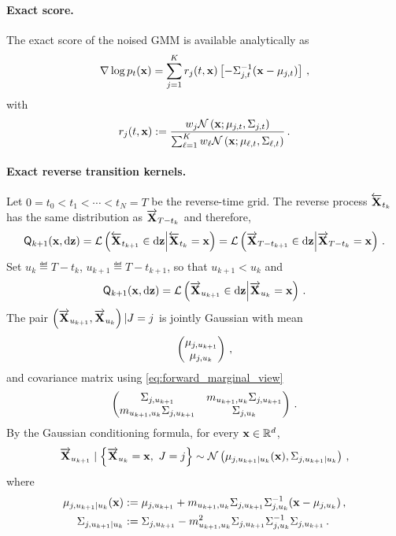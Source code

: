 \documentclass[11pt]{article}
\theoremstyle{plain}
\theoremstyle{definition}
\theoremstyle{remark}
\begin{document}
\paragraph{Exact score.} The exact score of the noised GMM is available analytically as
\begin{equation*} %
\nabla \log p_t(\x) = \sum_{j=1}^{K} r_j(t,\x) \left[ -\Sigma_{j,t}^{-1}(\x-\mu_{j,t}) \right] \eqsp,
\end{equation*}
with
\begin{equation*} %
r_j(t,\x) \eqdef \frac{ w_j\gaussiand{\mu_{j,t}}{\Sigma_{j,t}}[\x] }{ \sum_{\ell=1}^{K} w_\ell\gaussiand{\mu_{\ell,t}}{\Sigma_{\ell,t}}[\x] }  \eqsp.
\end{equation*} 


\paragraph{Exact reverse transition kernels.}
Let $0=t_0<t_1<\cdots<t_N=T$ be the reverse-time grid. The reverse process
$\overleftarrow{\mathbf{X}}_{t_k}$ has the same distribution as $\overrightarrow{\mathbf{X}}_{T-t_k}$ and therefore,
$$
\mk{k+1}(\x,\rmd \z) = \mathcal L \left( \Xola_{t_{k+1}}\in\rmd \z \middle| \Xola_{t_k}=\x \right) = \mathcal L \left( \Xora_{T-t_{k+1}}\in\rmd \z \middle| \Xora_{T-t_k}=\x \right) \eqsp.
$$
Set $u_k\eqdef T-t_k$, $u_{k+1}\eqdef T-t_{k+1}$, so that $u_{k+1}<u_k$ and
$$
\mk{k+1}(\x,\rmd \z)
= \mathcal L \left( \Xora_{u_{k+1}}\in\rmd \z \middle| \Xora_{u_k}=\x \right) \eqsp.
$$
The pair $\left( \overrightarrow{\mathbf{X}}_{u_{k+1}}, \overrightarrow{\mathbf{X}}_{u_k} \right) | J=j $ is jointly Gaussian with mean
$$
\begin{pmatrix}
\mu_{j,u_{k+1}} \\
\mu_{j,u_k}
\end{pmatrix} \,,
$$
and covariance matrix using \eqref{eq:forward_marginal_view}
$$
\begin{pmatrix}
\Sigma_{j,u_{k+1}} & m_{u_{k+1},u_k}\Sigma_{j,u_{k+1}} \\
m_{u_{k+1},u_k}\Sigma_{j,u_{k+1}}  & \Sigma_{j,u_k}
\end{pmatrix} \,.
$$
By the Gaussian conditioning formula, for every $\mathbf{x}\in\mathbb{R}^d$,
$$
\Xora_{u_{k+1}} \mid \left\{ \Xora_{u_k}=\x,\ J=j \right\} \sim \gaussiand{ \mu_{j,u_{k+1}|u_k}(\x) }{ \Sigma_{j,u_{k+1}|u_k} } \eqsp,
$$
where
\begin{align*}
\mu_{j,u_{k+1}|u_k}(\mathbf{x})
&:= \mu_{j,u_{k+1}} + m_{u_{k+1},u_k} \Sigma_{j,u_{k+1}} \Sigma_{j,u_k}^{-1} (\mathbf{x}-\mu_{j,u_k}) \,, \\
\Sigma_{j,u_{k+1}|u_k}
&:= \Sigma_{j,u_{k+1}} - m_{u_{k+1},u_k}^{2} \Sigma_{j,u_{k+1}} \Sigma_{j,u_k}^{-1} \Sigma_{j,u_{k+1}} \, .
\end{align*}
\end{document}
